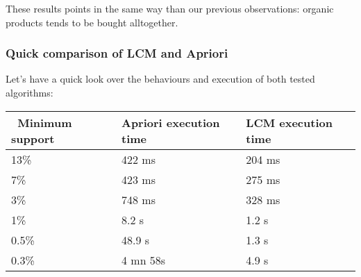 \documentclass[11pt]{article}
\begin{document}
    These results points in the same way than our previous observations:
organic products tends to be bought alltogether.

\hypertarget{quick-comparison-of-lcm-and-apriori}{%
\subsubsection{Quick comparison of LCM and
Apriori}\label{quick-comparison-of-lcm-and-apriori}}

Let's have a quick look over the behaviours and execution of both tested
algorithms:

\begin{longtable}[]{@{}lll@{}}
\toprule
~Minimum support & Apriori execution time & LCM execution
time\tabularnewline
\midrule
\endhead
13\% & 422 ms & 204 ms\tabularnewline
7\% & 423 ms & 275 ms\tabularnewline
3\% & 748 ms & 328 ms\tabularnewline
1\% & 8.2 s & 1.2 s\tabularnewline
0.5\% & 48.9 s & 1.3 s\tabularnewline
0.3\% & 4 mn 58s & 4.9 s\tabularnewline
\bottomrule
\end{longtable}
\end{document}
